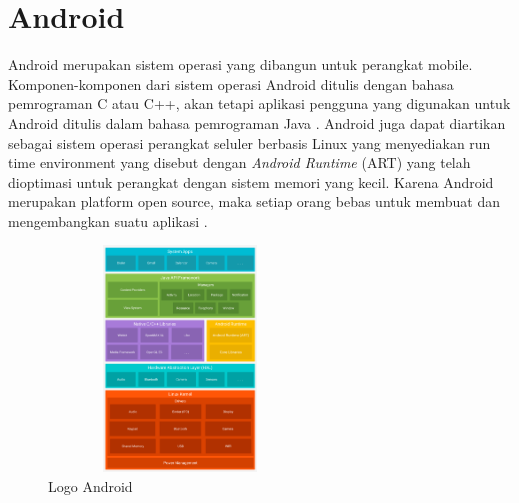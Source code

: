 \section{Android}
\par Android merupakan sistem operasi yang dibangun untuk perangkat mobile. Komponen-komponen dari sistem operasi Android ditulis dengan bahasa pemrograman C atau C++, akan tetapi aplikasi pengguna yang digunakan untuk Android ditulis dalam bahasa pemrograman Java \cite{ableson2012android}. Android juga dapat diartikan sebagai sistem operasi perangkat seluler berbasis Linux yang menyediakan run time environment yang disebut dengan \textit{Android Runtime} (ART) yang telah dioptimasi untuk perangkat dengan sistem memori yang kecil. Karena Android merupakan platform open source, maka setiap orang bebas untuk membuat dan mengembangkan suatu aplikasi \cite{supardi2011}.
\begin{figure}[H]
	\centering
	\includegraphics [width = 7cm, height= 6cm]{gambar/android}
	\caption{Logo Android}
	\label{android}
\end{figure}




